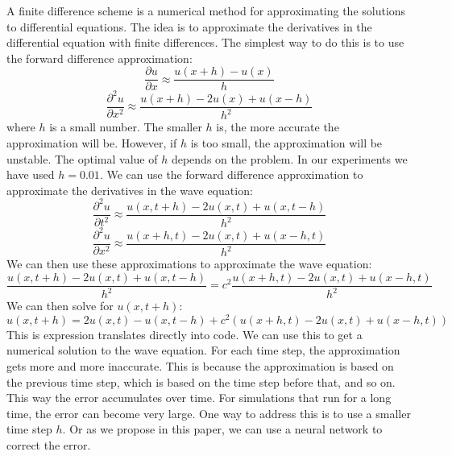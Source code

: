 \documentclass[twoside,11pt]{report}
\begin{document}
    A finite difference scheme is a numerical method for approximating the solutions to differential equations.
    The idea is to approximate the derivatives in the differential equation with finite differences.
    The simplest way to do this is to use the forward difference approximation:
    \begin{equation}
    \frac{\partial u}{\partial x} \approx \frac{u(x+h) - u(x)}{h}
    \end{equation}
    \begin{equation}
    \frac{\partial^2 u}{\partial x^2} \approx \frac{u(x+h) - 2u(x) + u(x-h)}{h^2}
    \end{equation}
    where $h$ is a small number. The smaller $h$ is, the more accurate the approximation will be.
    However, if $h$ is too small, the approximation will be unstable. The optimal value of $h$ depends
    on the problem. In our experiments we have used $h=0.01$.
    We can use the forward difference approximation to approximate the derivatives in the wave equation:
    \begin{equation}
    \frac{\partial^2 u}{\partial t^2} \approx \frac{u(x,t+h) - 2u(x,t) + u(x,t-h)}{h^2}
    \end{equation}
    \begin{equation}
    \frac{\partial^2 u}{\partial x^2} \approx \frac{u(x+h,t) - 2u(x,t) + u(x-h,t)}{h^2}
    \end{equation}
    We can then use these approximations to approximate the wave equation:
    \begin{equation}
    \frac{u(x,t+h) - 2u(x,t) + u(x,t-h)}{h^2} = c^2 \frac{u(x+h,t) - 2u(x,t) + u(x-h,t)}{h^2}
    \end{equation}
    We can then solve for $u(x,t+h)$:
    \begin{equation}
    u(x,t+h) = 2u(x,t) - u(x,t-h) + c^2(u(x+h,t) - 2u(x,t) + u(x-h,t))
    \end{equation}
    This is expression translates directly into code. We can use this to get a numerical solution to the wave equation.
    For each time step, the approximation gets more and more inaccurate. This is because the approximation is based on
    the previous time step, which is based on the time step before that, and so on. This way the error accumulates
    over time. For simulations that run for a long time, the error can become very large. One way to address this
    is to use a smaller time step $h$. Or as we propose in this paper, we can use a neural network to correct the
    error.
\end{document}
